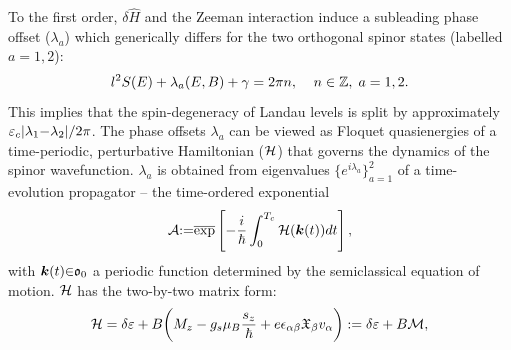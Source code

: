 \documentclass[aps, showpacs, twocolumn, notitlepage, superscriptaddress]{revtex4-1}
\begin{document}
To the first order, $\delta \hat{H}$ and the Zeeman interaction induce a subleading phase offset ($\lambda_a$) which generically differs for the two orthogonal spinor states (labelled $a{=}1,2$):
\begin{equation}
l^2S(E)+\lambda_a(E,B)+\gamma=2\pi n,\;\;\;\;  n\in \mathbb{Z},\;a=1,2. \label{eq:rule}
\end{equation}
This implies that the spin-degeneracy of Landau levels is split by approximately  $\varepsilon_c|\lambda_1{-}\lambda_2|/2\pi$. The phase offsets $\lambda_a$ can be viewed as Floquet quasienergies\cite{shirley_solution_1965} of a time-periodic, perturbative Hamiltonian (${\cal H}$) that governs the dynamics of the spinor wavefunction.  $\lambda_a$ is obtained from eigenvalues $\{e^{i\lambda_a}\}_{a=1}^2$ of a time-evolution propagator -- the time-ordered exponential 
\begin{equation}
{\cal A}{:}{=}\overline{\exp}\left[-\frac{i}{\hbar}\int_0^{T_c} {\cal H}(\boldsymbol{k}(t)) dt\right],
\label{eq:prop}
\end{equation} 
with $\boldsymbol{k}(t){\in}\mathfrak{o}_0$ a periodic function determined by the semiclassical equation of motion.   ${\cal H}$ has the two-by-two matrix form:
\begin{equation}
  {\cal H}=\delta \varepsilon +B\bigg(M_z -g_s\mu_{B}\frac{s_z}{\hbar} + e\epsilon_{\alpha\beta}\mathfrak{X}_{\beta}v_{\alpha}\bigg):=\delta \varepsilon+B{\cal M},\label{eq:H1}
\end{equation}
\end{document}
